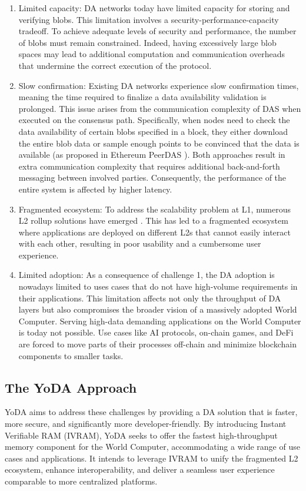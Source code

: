 \documentclass[11pt]{article}
\begin{document}
\begin{enumerate}
    \item Limited capacity: DA networks today have limited capacity for storing and verifying blobs. This limitation involves a security-performance-capacity tradeoff. To achieve adequate levels of security and performance, the number of blobs must remain constrained. Indeed, having excessively large blob spaces may lead to additional computation and communication overheads that undermine the correct execution of the protocol.
    \item Slow confirmation: Existing DA networks experience slow confirmation times, meaning the time required to finalize a data availability validation is prolonged. This issue arises from the communication complexity of DAS when executed on the consensus path. Specifically, when nodes need to check the data availability of certain blobs specified in a block, they either download the entire blob data or sample enough points to be convinced that the data is available (as proposed in Ethereum PeerDAS \cite{peerdas2024}). Both approaches result in extra communication complexity that requires additional back-and-forth messaging between involved parties. Consequently, the performance of the entire system is affected by higher latency.
    \item Fragmented ecosystem: To address the scalability problem at L1, numerous L2 rollup solutions have emerged \cite{crt:2024/889}. This has led to a fragmented ecosystem where applications are deployed on different L2s that cannot easily interact with each other, resulting in poor usability and a cumbersome user experience.
    \item Limited adoption: As a consequence of challenge 1, the DA adoption is nowadays limited to uses cases that do not have high-volume requirements in their applications. This limitation affects not only the throughput of DA layers but also compromises the broader vision of a massively adopted World Computer. Serving high-data demanding applications on the World Computer is today not possible. Use cases like AI protocols, on-chain games, and DeFi are forced to move parts of their processes off-chain and minimize blockchain components to smaller tasks.
\end{enumerate}

\subsection{The YoDA Approach}
YoDA aims to address these challenges by providing a DA solution that is faster, more secure, and significantly more developer-friendly. By introducing Instant Verifiable RAM (IVRAM), YoDA seeks to offer the fastest high-throughput memory component for the World Computer, accommodating a wide range of use cases and applications. It intends to leverage IVRAM to unify the fragmented L2 ecosystem, enhance interoperability, and deliver a seamless user experience comparable to more centralized platforms.
\end{document}
